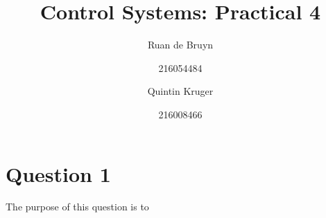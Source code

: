 \title{Control Systems: Practical 4}
\author{Ruan de Bruyn \and 216054484 \and Quintin Kruger \and 216008466}



\maketitle
\newpage
{}
\tableofcontents
\listoffigures
\newpage
{}

\section{Question 1} %
\label{sec:question_1}
The purpose of this question is to 

